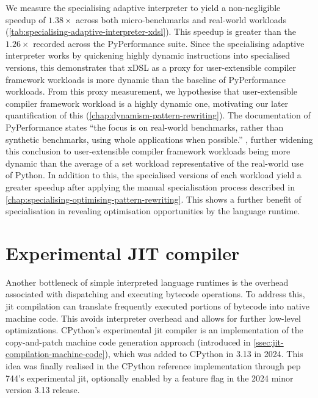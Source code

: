 We measure the specialising adaptive interpreter to yield a non-negligible speedup of $1.38\times$ across both micro-benchmarks and real-world workloads (\autoref{tab:specialising-adaptive-interpreter-xdsl}).
This speedup is greater than the $1.26\times$ recorded across the PyPerformance suite.
Since the specialising adaptive interpreter works by quickening highly dynamic instructions into specialised versions, this demonstrates that xDSL as a proxy for user-extensible compiler framework workloads is more dynamic than the baseline of PyPerformance workloads. From this proxy measurement, we hypothesise that user-extensible compiler framework workload is a highly dynamic one, motivating our later quantification of this (\autoref{chap:dynamism-pattern-rewriting}).
The documentation of PyPerformance states ``the focus is on real-world benchmarks, rather than synthetic benchmarks, using whole applications when possible.'' \cite{collinwinterPythonPyperformance2025}, further widening this conclusion to user-extensible compiler framework workloads being more dynamic than the average of a set workload representative of the real-world use of Python.
In addition to this, the specialised versions of each workload yield a greater speedup after applying the manual specialisation process described in \autoref{chap:specialising-optimising-pattern-rewriting}. This shows a further benefit of specialisation in revealing optimisation opportunities by the language runtime.



\section{Experimental JIT compiler}
\label{sec:experimental-jit-compiler}

Another bottleneck of simple interpreted language runtimes is the overhead associated with dispatching and executing bytecode operations.
To address this, \acf{jit} compilation can translate frequently executed portions of bytecode into native machine code. This avoids interpreter overhead and allows for further low-level optimizations.
CPython's experimental \ac{jit} compiler is an implementation of the copy-and-patch machine code generation approach (introduced in \autoref{ssec:jit-compilation-machine-code}), which was added to CPython in 3.13 in 2024.
This idea was finally realised in the CPython reference implementation through \ac{pep} 744's experimental \ac{jit}, optionally enabled by a feature flag in the 2024 minor version 3.13 release.

